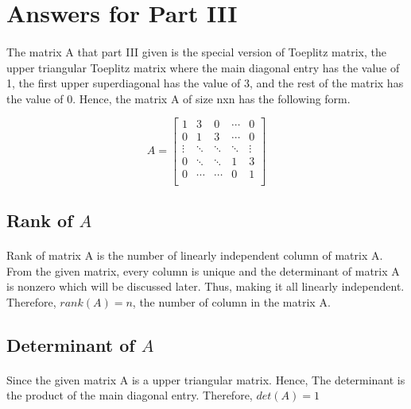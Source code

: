 \documentclass[a4paper]{article}
\begin{document}
\section*{Answers for Part III}
\paragraph{}
The matrix A that part III given is the special version of Toeplitz matrix, the upper triangular Toeplitz matrix where the main diagonal entry has the value of 1, the first upper superdiagonal has the value of 3, and the rest of the matrix has the value of 0. Hence, the matrix A of size nxn has the following form.

\begin{equation*}
A=
\begin{bmatrix}
   1 & 3 & 0 & \cdots & 0 \\
   0 & 1 & 3 & \cdots & 0 \\ 
   \vdots & \ddots & \ddots & \ddots & \vdots\\
   0 & \ddots &\ddots & 1 & 3 \\
   0 & \cdots &\cdots & 0 & 1\\
\end{bmatrix}
\end{equation*}


\subsection*{Rank of $A$}
\paragraph{}
Rank of matrix A is the number of linearly independent column of matrix A. From the given matrix, every column is unique and the determinant of matrix A is nonzero which will be discussed later. Thus, making it all linearly independent. Therefore, $rank(A) = n$, the number of column in the matrix A.

\subsection*{Determinant of $A$}
\paragraph{}
Since the given matrix A is a upper triangular matrix. Hence, The determinant is the product of the main diagonal entry. Therefore, $det(A) = 1$
\end{document}
